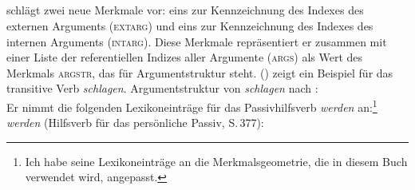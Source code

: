 {\subsection{\citet{Ryu97a}}
\label{sec-ryu-passive}

\mbox{}\citet{Ryu97a} schlägt zwei neue Merkmale vor: eins zur Kennzeichnung des Indexes des
externen Arguments (\textsc{extarg}) und eins zur Kennzeichnung des Indexes des internen
Arguments (\textsc{intarg}). Diese Merkmale repräsentiert er zusammen mit einer Liste
der referentiellen Indizes aller Argumente (\textsc{args})
als Wert des Merkmals \textsc{argstr}, das für Argumentstruktur steht.
() zeigt ein Beispiel für das transitive Verb \emph{schlagen}.
\ea
Argumentstruktur von \emph{schlagen} nach :\\
\z
Er nimmt die folgenden Lexikoneinträge für das Passivhilfsverb \emph{werden} an:\footnote{
  Ich habe seine Lexikoneinträge an die Merkmalsgeometrie, die in diesem Buch verwendet wird,
  angepasst.%
}
\eas
\emph{werden} (Hilfsverb für das persönliche Passiv, S.\,377):\\
\zs

}
